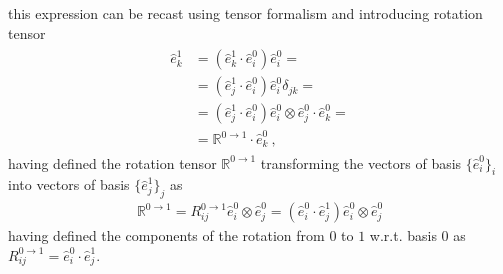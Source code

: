 \documentclass[letterpaper,10pt,english]{jupyterBook}
\begin{document}
\sphinxAtStartPar
this expression can be recast using tensor formalism and introducing rotation tensor
\begin{equation*}
\begin{split}\begin{aligned}
  \hat{e}_k^1
  & = \left( \hat{e}_k^1 \cdot \hat{e}^0_i \right) \hat{e}^0_i = \\
  & = \left( \hat{e}_j^1 \cdot \hat{e}^0_i \right) \hat{e}^0_i \delta_{jk} = \\
  & = \left( \hat{e}_j^1 \cdot \hat{e}^0_i \right) \hat{e}^0_i \otimes \hat{e}^0_j \cdot \hat{e}^0_k = \\
  & = \mathbb{R}^{0 \rightarrow 1} \cdot \hat{e}^0_k \ ,
\end{aligned}\end{split}
\end{equation*}
\sphinxAtStartPar
having defined the rotation tensor \(\mathbb{R}^{0 \rightarrow 1}\) transforming the vectors of basis \(\{ \hat{e}^0_i \}_i\) into vectors of basis \(\{ \hat{e}^1_j \}_j\) as
\begin{equation*}
\begin{split}\mathbb{R}^{0 \rightarrow 1}
 = R_{ij}^{0 \rightarrow 1} \hat{e}^0_i \otimes \hat{e}^0_j 
 = \left( \hat{e}^0_i \cdot \hat{e}^1_j \right) \hat{e}^0_i \otimes \hat{e}^0_j
\end{split}
\end{equation*}
\sphinxAtStartPar
having defined the components of the rotation from \(0\) to \(1\) w.r.t. basis \(0\) as \(R^{0 \rightarrow 1}_{ij} = \hat{e}^0_i \cdot \hat{e}^1_j\).
\end{document}
